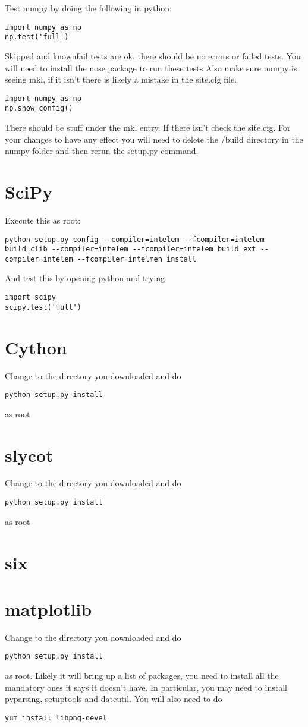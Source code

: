 Test numpy by doing the following in python:
\begin{verbatim}
import numpy as np
np.test('full')
\end{verbatim}
Skipped and knownfail tests are ok, there should be no errors or failed tests. You will need to install the nose package to run these tests
Also make sure numpy is seeing mkl, if it isn't there is likely a mistake in the site.cfg file. 
\begin{verbatim}
import numpy as np
np.show_config()
\end{verbatim}
There should be stuff under the mkl entry. If there isn't check the site.cfg. For your changes to have any effect you will need to delete the /build directory in the numpy folder and then rerun the setup.py command.

\section{SciPy}
Execute this as root: 
\begin{verbatim}
python setup.py config --compiler=intelem --fcompiler=intelem build_clib --compiler=intelem --fcompiler=intelem build_ext --compiler=intelem --fcompiler=intelmen install
\end{verbatim}
And test this by opening python and trying 
\begin{verbatim}
import scipy
scipy.test('full')
\end{verbatim}

\section{Cython}
Change to the directory you downloaded and do
\begin{verbatim}
python setup.py install
\end{verbatim}
as root

\section{slycot}
Change to the directory you downloaded and do
\begin{verbatim}
python setup.py install
\end{verbatim}
as root

\section{six}
\section{matplotlib}
Change to the directory you downloaded and do
\begin{verbatim}
python setup.py install
\end{verbatim}
as root. Likely it will bring up a list of packages, you need to install all the mandatory ones it says it doesn't have. In particular, you may need to install pyparsing, setuptools and dateutil. You will also need to do 
\begin{verbatim}
yum install libpng-devel
\end{verbatim}


